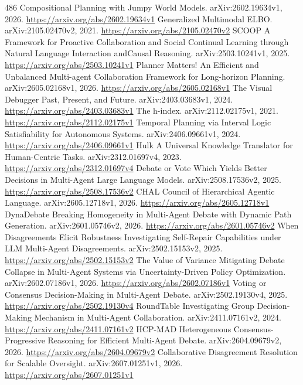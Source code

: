 \documentclass[11pt]{article}
\begin{document}
\begin{thebibliography}{486}
 Compositional Planning with Jumpy World Models. arXiv:2602.19634v1, 2026. \url{https://arxiv.org/abs/2602.19634v1}
 Generalized Multimodal ELBO. arXiv:2105.02470v2, 2021. \url{https://arxiv.org/abs/2105.02470v2}
 SCOOP A Framework for Proactive Collaboration and Social Continual Learning through Natural Language Interaction andCausal Reasoning. arXiv:2503.10241v1, 2025. \url{https://arxiv.org/abs/2503.10241v1}
 Planner Matters! An Efficient and Unbalanced Multi-agent Collaboration Framework for Long-horizon Planning. arXiv:2605.02168v1, 2026. \url{https://arxiv.org/abs/2605.02168v1}
 The Visual Debugger Past, Present, and Future. arXiv:2403.03683v1, 2024. \url{https://arxiv.org/abs/2403.03683v1}
 The h-index. arXiv:2112.02175v1, 2021. \url{https://arxiv.org/abs/2112.02175v1}
 Temporal Planning via Interval Logic Satisfiability for Autonomous Systems. arXiv:2406.09661v1, 2024. \url{https://arxiv.org/abs/2406.09661v1}
 Hulk A Universal Knowledge Translator for Human-Centric Tasks. arXiv:2312.01697v4, 2023. \url{https://arxiv.org/abs/2312.01697v4}
 Debate or Vote Which Yields Better Decisions in Multi-Agent Large Language Models. arXiv:2508.17536v2, 2025. \url{https://arxiv.org/abs/2508.17536v2}
 CHAL Council of Hierarchical Agentic Language. arXiv:2605.12718v1, 2026. \url{https://arxiv.org/abs/2605.12718v1}
 DynaDebate Breaking Homogeneity in Multi-Agent Debate with Dynamic Path Generation. arXiv:2601.05746v2, 2026. \url{https://arxiv.org/abs/2601.05746v2}
 When Disagreements Elicit Robustness Investigating Self-Repair Capabilities under LLM Multi-Agent Disagreements. arXiv:2502.15153v2, 2025. \url{https://arxiv.org/abs/2502.15153v2}
 The Value of Variance Mitigating Debate Collapse in Multi-Agent Systems via Uncertainty-Driven Policy Optimization. arXiv:2602.07186v1, 2026. \url{https://arxiv.org/abs/2602.07186v1}
 Voting or Consensus Decision-Making in Multi-Agent Debate. arXiv:2502.19130v4, 2025. \url{https://arxiv.org/abs/2502.19130v4}
 RoundTable Investigating Group Decision-Making Mechanism in Multi-Agent Collaboration. arXiv:2411.07161v2, 2024. \url{https://arxiv.org/abs/2411.07161v2}
 HCP-MAD Heterogeneous Consensus-Progressive Reasoning for Efficient Multi-Agent Debate. arXiv:2604.09679v2, 2026. \url{https://arxiv.org/abs/2604.09679v2}
 Collaborative Disagreement Resolution for Scalable Oversight. arXiv:2607.01251v1, 2026. \url{https://arxiv.org/abs/2607.01251v1}

\end{thebibliography}
\end{document}
